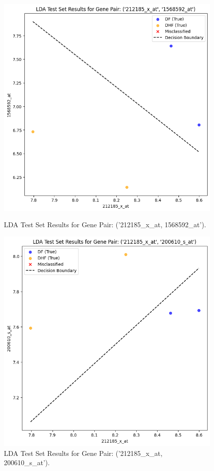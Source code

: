 \documentclass[final]{article}
\begin{document}
        \begin{figure}[H]
            \centering
            \begin{minipage}{0.45\textwidth}
                \includegraphics[width=\textwidth]{212185_x_at, 1568592_at.png}
                \caption{LDA Test Set Results for Gene Pair: ('212185\_x\_at, 1568592\_at').}
            \end{minipage}
            \hfill
            \begin{minipage}{0.45\textwidth}
                \includegraphics[width=\textwidth]{212185_x_at, 200610_s_at.png}
                \caption{LDA Test Set Results for Gene Pair: ('212185\_x\_at, 200610\_s\_at').}
            \end{minipage}
        \end{figure}
\end{document}
